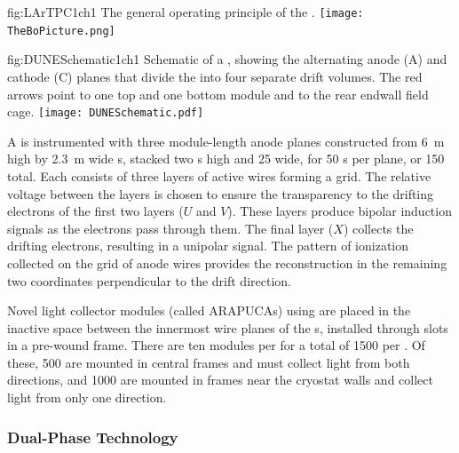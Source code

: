 \begin{dunefigure}{fig:LArTPC1ch1}
{The general operating principle of the  .}
\texttt{[image: TheBoPicture.png]} 
\end{dunefigure}

\begin{dunefigure}{fig:DUNESchematic1ch1}
{Schematic of a \nominalmodsize {}  , showing the alternating anode (A) and cathode (C) planes that divide the  into four separate drift volumes. The red arrows point to one top and one bottom  module and to the rear endwall field cage.}
\texttt{[image: DUNESchematic.pdf]}
\end{dunefigure}

A  is instrumented with three module-length anode planes constructed from \SI{6}{m} high by \SI{2.3}{m} wide s, stacked two s high and 25 wide, for 50 s per plane, or 150 total. Each  consists of three layers of active wires forming a grid. The relative voltage between the layers is chosen to ensure the transparency to the drifting electrons of the first two layers ($U$ and $V$). These layers produce bipolar induction signals as the electrons pass through them. The final layer ($X$) collects the drifting electrons, resulting in a unipolar signal. The pattern of ionization collected on the grid of anode wires provides the reconstruction in the remaining two coordinates perpendicular to the drift direction.



Novel  light collector modules (called ARAPUCAs) using  are placed in the inactive space between the innermost wire planes of the s, installed through slots in a pre-wound  frame. 
There are ten  modules per  for a total of \num{1500} per .  Of these, \num{500} are mounted in central  frames and must collect light from both directions, 
and \num{1000} are mounted in frames  near the %
cryostat walls and collect light from only one direction. 

\FloatBarrier
\subsubsection{Dual-Phase Technology}
\label{sec:fddp-exec-splar}

